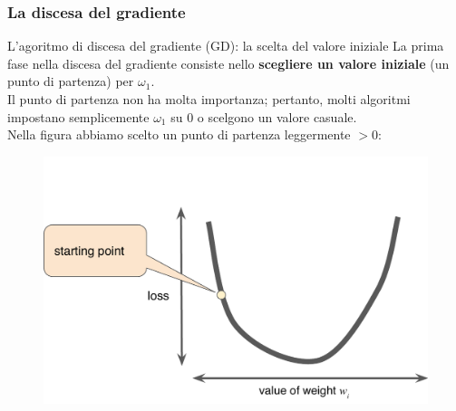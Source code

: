 \begin{frame}

	\frametitle{La discesa del gradiente}

	\begin{block}{L'agoritmo di discesa del gradiente (GD): la scelta del valore iniziale}
		La prima fase nella discesa del gradiente consiste nello \textbf{scegliere un valore iniziale} (un punto di partenza) per $\omega_1$.\\
		Il punto di partenza non ha molta importanza; pertanto, molti algoritmi impostano semplicemente $\omega_1$ su 0 o scelgono un valore casuale.\\
		\vspace{1mm}
		Nella figura abbiamo scelto un punto di partenza leggermente $>0$:
		\begin{figure}[!htbp]
			\centering
			\includegraphics[width=0.55\linewidth]{images/supervised/training_reducing_loss/GradientDescentStartingPoint.pdf}
		\end{figure}
	\end{block}

\end{frame}


